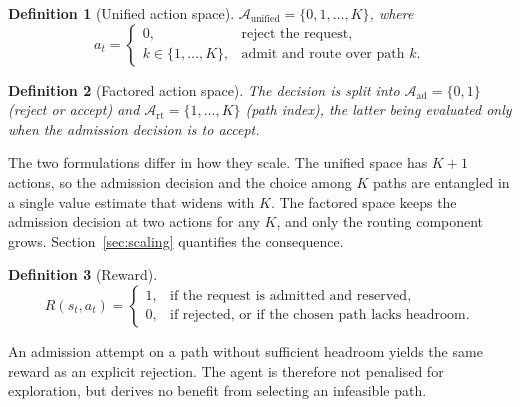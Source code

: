 \documentclass[10pt,journal,comsoc]{IEEEtran}
\newtheorem{definition}{Definition}
\begin{document}
\begin{definition}[Unified action space]
\label{def:unified}
$\mathcal{A}_{\text{unified}} = \{0,1,\dots,K\}$, where
\begin{equation}
a_t =
\begin{cases}
0, & \text{reject the request},\\
k \in \{1,\dots,K\}, & \text{admit and route over path } k .
\end{cases}
\label{eq:aunified}
\end{equation}
\end{definition}

\begin{definition}[Factored action space]
\label{def:separated}
The decision is split into
$\mathcal{A}_{\text{ad}} = \{0,1\}$ (reject or accept) and
$\mathcal{A}_{\text{rt}} = \{1,\dots,K\}$ (path index), the latter being
evaluated only when the admission decision is to accept.
\end{definition}

The two formulations differ in how they scale. The unified space has
$K+1$ actions, so the admission decision and the choice among $K$ paths
are entangled in a single value estimate that widens with $K$. The
factored space keeps the admission decision at two actions for any $K$,
and only the routing component grows. Section~\ref{sec:scaling}
quantifies the consequence.

\begin{definition}[Reward]
\label{def:reward}
\begin{equation}
R(s_t,a_t) =
\begin{cases}
1, & \text{if the request is admitted and reserved},\\
0, & \text{if rejected, or if the chosen path lacks headroom.}
\end{cases}
\label{eq:reward}
\end{equation}
\end{definition}
An admission attempt on a path without sufficient headroom yields the
same reward as an explicit rejection. The agent is therefore not
penalised for exploration, but derives no benefit from selecting an
infeasible path.
\end{document}
